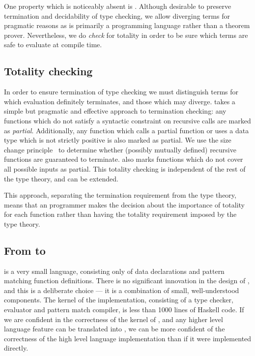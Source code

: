 One property which is noticeably absent is .
Although desirable to preserve termination and decidability of type checking,
we allow diverging terms for pragmatic reasons as \Idris{} is primarily a
programming language rather than a theorem prover. Nevertheless, we do
\emph{check} for totality in order to be sure which terms are safe to
evaluate at compile time.

\subsection{Totality checking}

In order to ensure termination of type checking we must distinguish terms for
which evaluation definitely terminates, and those which may diverge. \TT{}
takes a simple but pragmatic and effective approach to termination checking:
any functions which do not satisfy a syntactic constraint on recursive calls
are marked as \emph{partial}. Additionally, any function which calls a partial
function or uses a data type which is not strictly positive is also marked as
partial. We use the size change principle~\cite{Lee2001} to determine whether
(possibly mutually defined) recursive functions are guaranteed to
terminate.
\TT{} also marks functions which do not cover
all possible inputs as partial. This totality checking is independent of the
rest of the type theory, and can be extended.

This approach, separating the termination requirement from the type theory,
means that an \Idris{} programmer makes the decision about the importance of
totality for each function rather than having the totality requirement imposed
by the type theory.

\subsection{From \Idris{} to \TT{}}

\TT{} is a very small language, consisting only of data declarations and pattern matching
function definitions. There is no significant innovation in the design of \TT{}, and this
is a deliberate choice --- it is a combination of small, well-understood components.
The kernel of the \TT{} implementation, consisting of a type checker, evaluator and
pattern match compiler, is less than 1000 lines of Haskell code. If we are confident
in the correctness of the kernel of \TT{}, and any higher level language feature
can be translated into \TT{}, we can be more confident of the correctness of the high
level language implementation than if it were implemented directly.

